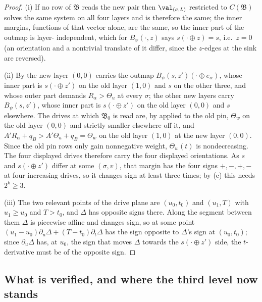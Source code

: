 \begin{proof}
(i) If no row of $\mathfrak B$ reads the new pair
then $\val_{(\sigma,L)}$ restricted to $C(\mathfrak B)$ solves the same system
on all four layers and is therefore the same; the inner margins, functions of
that vector alone, are the same, so the inner part of the outmap is layer-
independent, which for $B_\varphi(\cdot,z)$ says $s(\cdot\oplus z)=s$, i.e.\
$z=0$ (an orientation and a nontrivial translate of it differ, since the
$z$-edges at the sink are reversed).

(ii) By  the new layer $(0,0)$ carries the outmap
$B_\psi(s,z')(\cdot\oplus e_\alpha)$, whose inner part is $s(\cdot\oplus z')$
on the old layer $(1,0)$ and $s$ on the other three, and whose outer part
demands $R_\alpha>\Theta_u$ at every $\sigma$; the other new layers carry
$B_\psi(s,z')$, whose inner part is $s(\cdot\oplus z')$ on the old layer
$(0,0)$ and $s$ elsewhere. The drives at which $\mathfrak B_0$ is read are, by
\Cref{rs:level} applied to the old pin, $\Theta_w$ on the old layer $(0,0)$
and strictly smaller elsewhere off it, and $A'R_\alpha+q_B>A'\Theta_u+q_B
=\Theta_w$ on the old layer $(1,0)$ at the new layer $(0,0)$. Since the old
pin rows only gain nonnegative weight, $\Theta_w(t)$ is nondecreasing. The
four displayed drives therefore carry the four displayed orientations. As $s$
and $s(\cdot\oplus z')$ differ at some $(\sigma,v)$, that margin has the four
signs $+,-,+,-$ at four increasing drives, so it changes sign at least three
times; by \Cref{rs:drive}(c) this needs $2^{k}\ge3$.

(iii) The two relevant points of the drive plane are $(u_0,t_0)$ and
$(u_1,T)$ with $u_1\ge u_0$ and $T>t_0$, and $\Delta$ has opposite signs
there. Along the segment between them $\Delta$ is piecewise affine and
changes sign, so at some point
$(u_1-u_0)\partial_u\Delta+(T-t_0)\partial_t\Delta$ has the sign opposite to
$\Delta$'s sign at $(u_0,t_0)$; since $\partial_u\Delta$ has, at $u_0$, the
sign that moves $\Delta$ towards the $s(\cdot\oplus z')$ side, the
$t$-derivative must be of the opposite sign.
\end{proof}

\subsection{What is verified, and where the third level now stands}\label{rs:sec-verified}

